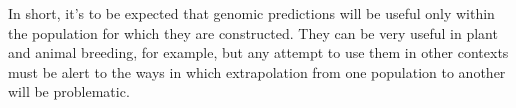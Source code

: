 \documentclass[12pt]{article}
\begin{document}
In short, it's to be expected that genomic predictions will be useful
only within the population for which they are constructed. They can be
very useful in plant and animal breeding, for example, but any attempt
to use them in other contexts must be alert to the ways in which
extrapolation from one population to another will be problematic.




\ccLicense
\end{document}
